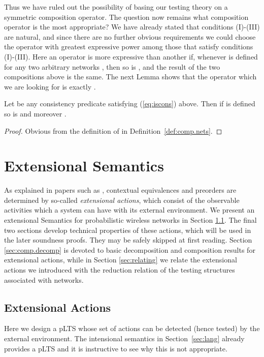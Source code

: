 \documentclass{LMCS}
\begin{document}
Thus we have ruled out the possibility of basing our testing theory on a symmetric 
composition operator. The question now remains what composition operator is the most appropriate? 
We have already stated that conditions (I)-(III) are natural, 
and since there are no further obvious requirements we
could choose  the operator with greatest expressive power among those that satisfy conditions (I)-(III). 
Here an operator  is more expressive than another 
 if, whenever  is defined 
for any two arbitrary networks , 
then so is , and the result of the two compositions 
above is the same. 
The next Lemma shows that the operator which we are looking for is exactly .
\begin{lem}
  Let  be any consistency predicate satisfying  (\ref{eq:iscons}) above. Then 
 if   is defined so is  and 
 moreover .  
\end{lem}
\begin{proof}
  Obvious from the definition of  in Definition~\ref{def:comp.nets}. 
\end{proof}


\section{Extensional Semantics}
\label{sec:ext.sem}
As explained in papers such as \cite{RS08-dbtm,dpibook}, contextual
equivalences and preorders are determined by so-called \emph{extensional actions},
which consist of the observable activities which a system can
have with its external environment. 
We present an extensional Semantics for probabilistic 
wireless networks in Section \ref{sec:ext.act}. 
The final two sections develop technical properties of these actions,
which will be used in the later soundness proofs. They may be safely skipped
at first reading. 
Section \ref{sec:comp.decomp} is devoted to 
basic decomposition and composition results for 
extensional actions, while in 
Section \ref{sec:relating} we relate 
the extensional actions we introduced 
with the reduction relation of 
the testing structures associated with 
networks.

\subsection{Extensional Actions}
\label{sec:ext.act}

Here we design a pLTS whose set of actions can be detected 
(hence tested) by the external environment. 
The intensional semantics in Section~\ref{sec:lang}
already provides a pLTS and it is instructive to see why this is not
appropriate.
\end{document}
